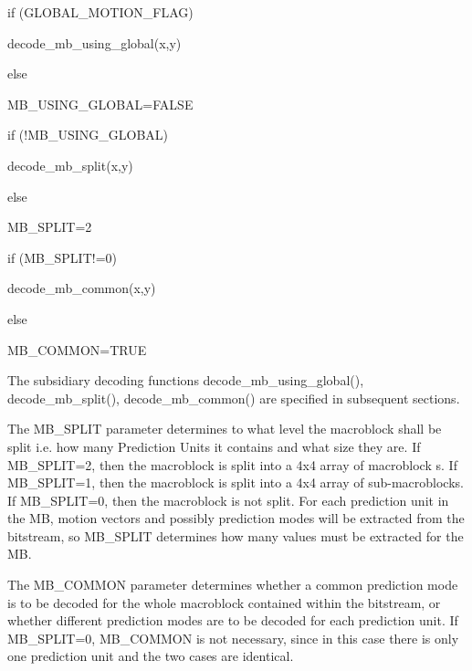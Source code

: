 {

     if (GLOBAL\_MOTION\_FLAG)

         decode\_mb\_using\_global(x,y)

     else

         MB\_USING\_GLOBAL=FALSE



     if (!MB\_USING\_GLOBAL)

         decode\_mb\_split(x,y)

     else

         MB\_SPLIT=2



     if (MB\_SPLIT!=0)

         decode\_mb\_common(x,y)

     else

         MB\_COMMON=TRUE

}

The subsidiary decoding functions decode\_mb\_using\_global(),
decode\_mb\_split(), decode\_mb\_common() are specified in subsequent
sections. 

The MB\_SPLIT parameter determines to what level the macroblock shall be
split i.e. how many Prediction Units it contains and what size they are.
If MB\_SPLIT=2, then the macroblock is split into a 4x4 array of
macroblock s. If MB\_SPLIT=1, then the macroblock is split into a 4x4
array of sub-macroblocks. If MB\_SPLIT=0, then the macroblock is not
split. For each prediction unit in the MB, motion vectors and possibly
prediction modes will be extracted from the bitstream, so MB\_SPLIT
determines how many values must be extracted for the MB.

The MB\_COMMON parameter determines whether a common prediction mode is
to be decoded for the whole macroblock contained within the bitstream,
or whether different prediction modes are to be decoded for each
prediction unit. If MB\_SPLIT=0, MB\_COMMON is not necessary, since in
this case there is only one prediction unit and the two cases are
identical. 


